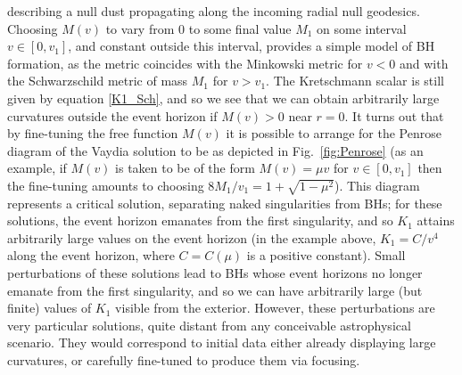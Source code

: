 \documentclass[floats,floatfix,showpacs,amssymb,prd,twocolumn,superscriptaddress,nofootinbib,nolongbibliography,reprint]{revtex4-2}
\begin{document}
describing a null dust propagating along the incoming radial null geodesics. Choosing $M(v)$ to vary from $0$ to some final value $M_1$ on some interval $v \in [0,v_1]$, and constant outside this interval, provides a simple model of BH formation, as the metric coincides with the Minkowski metric for $v<0$ and with the Schwarzschild metric of mass $M_1$ for $v>v_1$. The Kretschmann scalar is still given by equation \eqref{K1_Sch}, and so we see that we can obtain arbitrarily large curvatures outside the event horizon if $M(v)>0$ near $r=0$. It turns out that by fine-tuning the free function $M(v)$ it is possible to arrange for the Penrose diagram of the Vaydia solution to be as depicted in Fig.~\ref{fig:Penrose} \cite{HiscockWilliamsEardley:1982, Kuroda:1984, Joshi:1997, FayosTorres:2010} (as an example, if $M(v)$ is taken to be of the form $M(v)=\mu v$ for $v\in[0,v_1]$ then the fine-tuning amounts to choosing $8M_1/v_1=1+\sqrt{1-\mu^2}$). This diagram represents a critical solution, separating naked singularities from BHs; for these solutions, the event horizon emanates from the first singularity, and so $K_1$ attains arbitrarily large values on the event horizon (in the example above, $K_1 = C/v^4$ along the event horizon, where $C=C(\mu)$ is a positive constant). Small perturbations of these solutions lead to BHs whose event horizons no longer emanate from the first singularity, and so we can have arbitrarily large (but finite) values of $K_1$ visible from the exterior. However, these perturbations are very particular solutions, quite distant from any conceivable astrophysical scenario. They would correspond to initial data either already displaying large curvatures, or carefully fine-tuned to produce them via focusing.
\end{document}
